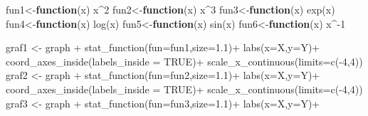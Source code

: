 \documentclass[
  letterpaper,
  DIV=11,
  numbers=noendperiod]{scrartcl}
\newenvironment{Shaded}{\begin{snugshade}}{\end{snugshade}}
\newcommand{\AttributeTok}[1]{\textcolor[rgb]{0.40,0.45,0.13}{#1}}
\newcommand{\ConstantTok}[1]{\textcolor[rgb]{0.56,0.35,0.01}{#1}}
\newcommand{\ControlFlowTok}[1]{\textcolor[rgb]{0.00,0.23,0.31}{\textbf{#1}}}
\newcommand{\DecValTok}[1]{\textcolor[rgb]{0.68,0.00,0.00}{#1}}
\newcommand{\FloatTok}[1]{\textcolor[rgb]{0.68,0.00,0.00}{#1}}
\newcommand{\FunctionTok}[1]{\textcolor[rgb]{0.28,0.35,0.67}{#1}}
\newcommand{\NormalTok}[1]{\textcolor[rgb]{0.00,0.23,0.31}{#1}}
\newcommand{\OtherTok}[1]{\textcolor[rgb]{0.00,0.23,0.31}{#1}}
\newcommand{\SpecialCharTok}[1]{\textcolor[rgb]{0.37,0.37,0.37}{#1}}
\newcommand{\StringTok}[1]{\textcolor[rgb]{0.13,0.47,0.30}{#1}}
\begin{document}
\begin{Shaded}
\begin{Highlighting}[]
\NormalTok{fun1}\OtherTok{\textless{}{-}}\ControlFlowTok{function}\NormalTok{(x) x}\SpecialCharTok{\^{}}\DecValTok{2}
\NormalTok{fun2}\OtherTok{\textless{}{-}}\ControlFlowTok{function}\NormalTok{(x) x}\SpecialCharTok{\^{}}\DecValTok{3}
\NormalTok{fun3}\OtherTok{\textless{}{-}}\ControlFlowTok{function}\NormalTok{(x) }\FunctionTok{exp}\NormalTok{(x)}
\NormalTok{fun4}\OtherTok{\textless{}{-}}\ControlFlowTok{function}\NormalTok{(x) }\FunctionTok{log}\NormalTok{(x)}
\NormalTok{fun5}\OtherTok{\textless{}{-}}\ControlFlowTok{function}\NormalTok{(x) }\FunctionTok{sin}\NormalTok{(x)}
\NormalTok{fun6}\OtherTok{\textless{}{-}}\ControlFlowTok{function}\NormalTok{(x) x}\SpecialCharTok{\^{}{-}}\DecValTok{1}

                          
\NormalTok{graf1 }\OtherTok{\textless{}{-}}\NormalTok{ graph }\SpecialCharTok{+}
  \FunctionTok{stat\_function}\NormalTok{(}\AttributeTok{fun=}\NormalTok{fun1,}\AttributeTok{size=}\FloatTok{1.1}\NormalTok{)}\SpecialCharTok{+}
  \FunctionTok{labs}\NormalTok{(}\AttributeTok{x=}\StringTok{\textquotesingle{}X\textquotesingle{}}\NormalTok{,}\AttributeTok{y=}\StringTok{\textquotesingle{}Y\textquotesingle{}}\NormalTok{)}\SpecialCharTok{+}
  \FunctionTok{coord\_axes\_inside}\NormalTok{(}\AttributeTok{labels\_inside =} \ConstantTok{TRUE}\NormalTok{)}\SpecialCharTok{+}
  \FunctionTok{scale\_x\_continuous}\NormalTok{(}\AttributeTok{limits=}\FunctionTok{c}\NormalTok{(}\SpecialCharTok{{-}}\DecValTok{4}\NormalTok{,}\DecValTok{4}\NormalTok{))}
\NormalTok{graf2 }\OtherTok{\textless{}{-}}\NormalTok{ graph }\SpecialCharTok{+}
  \FunctionTok{stat\_function}\NormalTok{(}\AttributeTok{fun=}\NormalTok{fun2,}\AttributeTok{size=}\FloatTok{1.1}\NormalTok{)}\SpecialCharTok{+}
  \FunctionTok{labs}\NormalTok{(}\AttributeTok{x=}\StringTok{\textquotesingle{}X\textquotesingle{}}\NormalTok{,}\AttributeTok{y=}\StringTok{\textquotesingle{}Y\textquotesingle{}}\NormalTok{)}\SpecialCharTok{+}
  \FunctionTok{coord\_axes\_inside}\NormalTok{(}\AttributeTok{labels\_inside =} \ConstantTok{TRUE}\NormalTok{)}\SpecialCharTok{+}
  \FunctionTok{scale\_x\_continuous}\NormalTok{(}\AttributeTok{limits=}\FunctionTok{c}\NormalTok{(}\SpecialCharTok{{-}}\DecValTok{4}\NormalTok{,}\DecValTok{4}\NormalTok{))}
\NormalTok{graf3 }\OtherTok{\textless{}{-}}\NormalTok{ graph }\SpecialCharTok{+}
  \FunctionTok{stat\_function}\NormalTok{(}\AttributeTok{fun=}\NormalTok{fun3,}\AttributeTok{size=}\FloatTok{1.1}\NormalTok{)}\SpecialCharTok{+}
  \FunctionTok{labs}\NormalTok{(}\AttributeTok{x=}\StringTok{\textquotesingle{}X\textquotesingle{}}\NormalTok{,}\AttributeTok{y=}\StringTok{\textquotesingle{}Y\textquotesingle{}}\NormalTok{)}\SpecialCharTok{+}

\end{Highlighting}
\end{Shaded}
\end{document}
